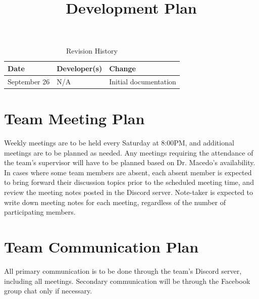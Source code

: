 \documentclass{article}
\title{Development Plan\\\progname}
\author{\authname}
\date{}
\begin{document}
\begin{table}[hp]
\caption{Revision History} \label{TblRevisionHistory}
\begin{tabularx}{\textwidth}{llX}
\toprule
\textbf{Date} & \textbf{Developer(s)} & \textbf{Change}\\
\midrule
September 26 & N/A & Initial documentation\\
\bottomrule
\end{tabularx}
\end{table}

\newpage

\maketitle


\section{Team Meeting Plan}
Weekly meetings are to be held every Saturday at 8:00PM, and additional meetings are to be planned as needed. Any meetings requiring the attendance of the team's supervisor will have to be planned based on Dr. Macedo's availability. In cases where some team members are absent, each absent member is expected to bring forward their discussion topics prior to the scheduled meeting time, and review the meeting notes posted in the Discord server. Note-taker is expected to write down meeting notes for each meeting, regardless of the number of participating members.\\

\section{Team Communication Plan}
All primary communication is to be done through the team's Discord server, including all meetings. Secondary communication will be through the Facebook group chat only if necessary.\\
\end{document}
